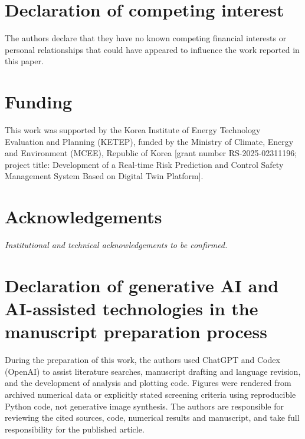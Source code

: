 \documentclass[12pt,a4paper]{article}
\begin{document}
\section*{Declaration of competing interest}
The authors declare that they have no known competing financial interests or personal
relationships that could have appeared to influence the work reported in this paper.

\section*{Funding}
This work was supported by the Korea Institute of Energy Technology Evaluation and
Planning (KETEP), funded by the Ministry of Climate, Energy and Environment (MCEE),
Republic of Korea [grant number RS-2025-02311196; project title: Development of a
Real-time Risk Prediction and Control Safety Management System Based on Digital Twin
Platform].

\section*{Acknowledgements}
\textit{Institutional and technical acknowledgements to be confirmed.}

\section*{Declaration of generative AI and AI-assisted technologies in the
manuscript preparation process}
During the preparation of this work, the authors used ChatGPT and Codex (OpenAI)
to assist literature searches, manuscript drafting and language revision, and the
development of analysis and plotting code. Figures were rendered from archived
numerical data or explicitly stated screening criteria using reproducible Python
code, not generative image synthesis. The authors are responsible for reviewing the
cited sources, code, numerical results and manuscript, and take full responsibility
for the published article.
\end{document}
